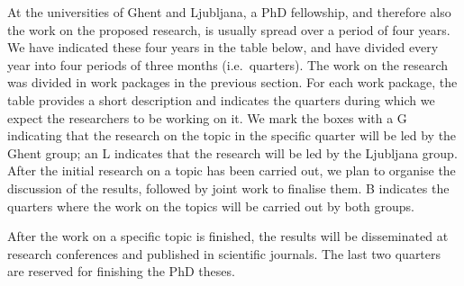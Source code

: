 \documentclass[11pt,dvipsnames,usenames,a4paper]{article}
\begin{document}
At the universities of Ghent and Ljubljana, a PhD fellowship, and therefore also the work on the proposed research, is usually spread over a period of four years.
We have indicated these four years in the table below, and have divided every year into four periods of three months (i.e.~quarters).
The work on the research was divided in work packages in the previous section.
For each work package, the table provides a short description and indicates the quarters during which we expect the researchers to be working on it.
We mark the boxes with a G indicating that the research on the topic in the specific quarter will be led by the Ghent group; an L indicates that the research will be led by the Ljubljana group. 
After the initial research on a topic has been carried out, we plan to organise the discussion of the results, followed by joint work to finalise them. 
B indicates the quarters where the work on the topics will be carried out by both groups. 

After the work on a specific topic is finished, the results will be disseminated at research conferences and published in scientific journals. 
The last two quarters are reserved for finishing the PhD theses. 





\end{document}
